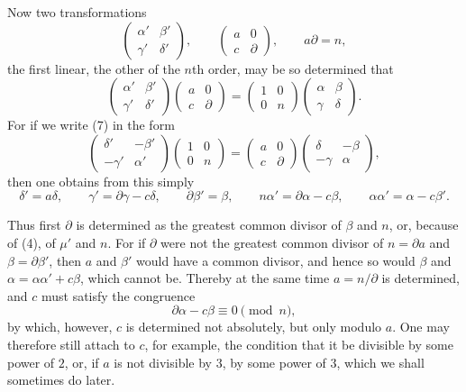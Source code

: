 \documentclass[11pt]{article}
\begin{document}
Now two transformations
\[
\begin{pmatrix}\alpha'&\beta'\\\gamma'&\delta'\end{pmatrix},
\qquad
\begin{pmatrix}a&0\\c&\partial\end{pmatrix},
\qquad a\partial=n,
\]
the first linear, the other of the $n$th order, may be so determined that
\begin{equation}
\begin{pmatrix}\alpha'&\beta'\\\gamma'&\delta'\end{pmatrix}
\begin{pmatrix}a&0\\c&\partial\end{pmatrix}
=
\begin{pmatrix}1&0\\0&n\end{pmatrix}
\begin{pmatrix}\alpha&\beta\\\gamma&\delta\end{pmatrix}.
\tag{7}
\end{equation}
For if we write (7) in the form
\[
\begin{pmatrix}\delta'&-\beta'\\-\gamma'&\alpha'\end{pmatrix}
\begin{pmatrix}1&0\\0&n\end{pmatrix}
=
\begin{pmatrix}a&0\\c&\partial\end{pmatrix}
\begin{pmatrix}\delta&-\beta\\-\gamma&\alpha\end{pmatrix},
\]
then one obtains from this simply
\begin{equation}
\delta'=a\delta,
\qquad
\gamma'=\partial\gamma-c\delta,
\qquad
\partial\beta'=\beta,
\qquad
n\alpha'=\partial\alpha-c\beta,
\qquad
\alpha\alpha'=\alpha-c\beta'.
\tag{8}
\end{equation}

Thus first $\partial$ is determined as the greatest common divisor of $\beta$ and $n$, or, because of (4), of $\mu'$ and $n$. For if $\partial$ were not the greatest common divisor of $n=\partial a$ and $\beta=\partial\beta'$, then $a$ and $\beta'$ would have a common divisor, and hence so would $\beta$ and $\alpha=\alpha\alpha'+c\beta$, which cannot be. Thereby at the same time $a=n/\partial$ is determined, and $c$ must satisfy the congruence
\begin{equation}
\partial\alpha-c\beta\equiv0\pmod n,
\tag{9}
\end{equation}
by which, however, $c$ is determined not absolutely, but only modulo $a$. One may therefore still attach to $c$, for example, the condition that it be divisible by some power of $2$, or, if $a$ is not divisible by $3$, by some power of $3$, which we shall sometimes do later.
\end{document}
